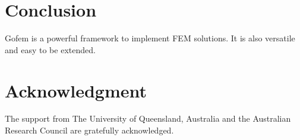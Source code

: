 \documentclass[twoside,journal]{IEEEtran}
\begin{document}
\section{Conclusion}
\label{sec:conclusion}

Gofem is a powerful framework to implement FEM solutions. It is also versatile and easy to be
extended.



\section*{Acknowledgment}

The support from The University of Queensland, Australia and the Australian Research Council are
gratefully acknowledged.





\end{document}
